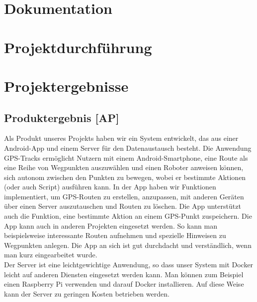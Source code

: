 \documentclass{article}
\begin{document}
\section{Dokumentation}
\section{Projektdurchführung}
\section{Projektergebnisse}
\subsection{Produktergebnis [AP]}
    Als Produkt unseres Projekts haben wir ein System entwickelt, das aus einer Android-App und einem Server für den Datenaustausch besteht.
    Die Anwendung GPS-Tracks ermöglicht Nutzern mit einem Android-Smartphone, eine Route als eine Reihe von Wegpunkten auszuwählen 
    und einen Roboter anweisen können, sich autonom zwischen den Punkten zu bewegen, wobei er bestimmte Aktionen (oder auch Script) ausführen kann. 
    In der App haben wir Funktionen implementiert, um GPS-Routen zu erstellen, anzupassen, mit anderen Geräten über einen Server auszutauschen
    und Routen zu löschen. Die App unterstützt auch die Funktion, eine bestimmte Aktion an einem GPS-Punkt zuspeichern. Die App kann auch in anderen 
    Projekten eingesetzt werden. So kann man beispielsweise interessante Routen aufnehmen und spezielle Hinweisen zu Wegpunkten anlegen.
    Die App an sich ist gut durchdacht und verständlich, wenn man kurz eingearbeitet wurde. \\ Der Server ist eine leichtgewichtige Anwendung,
    so dass unser System mit Docker leicht auf anderen Diensten eingesetzt werden kann. Man können zum Beispiel einen Raspberry Pi verwenden und darauf
    Docker installieren. Auf diese Weise kann der Server zu geringen Kosten betrieben werden. 
\end{document}
